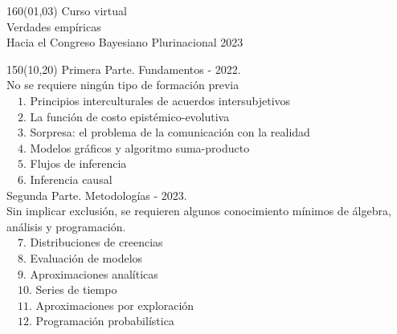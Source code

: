 \documentclass[shownotes,aspectratio=169]{beamer}
\begin{document}
\begin{frame}

\begin{textblock}{160}(01,03)\centering
\textcolor{black!85}{{\large
Curso virtual\\[-0.1cm] \Large Verdades empíricas \\[-0.1cm] \footnotesize Hacia el Congreso Bayesiano Plurinacional 2023}}
\end{textblock}


\begin{textblock}{150}(10,20)
\normalsize Primera Parte. Fundamentos - 2022. \\
\scriptsize No se requiere ningún tipo de formación previa \\[0.15cm] \footnotesize
\ \ $1$. Principios interculturales de acuerdos intersubjetivos \\
\ \ $2$. La función de costo epistémico-evolutiva\\
\ \ $3$. Sorpresa: el problema de la comunicación con la realidad \\
\ \ $4$. Modelos gráficos y algoritmo suma-producto\\
\ \ $5$. Flujos de inferencia \\
\ \ $6$. Inferencia causal \\[0.4cm]
\normalsize Segunda Parte. Metodologías - 2023.\scriptsize \\ Sin implicar exclusión, se requieren algunos conocimiento mínimos de álgebra, análisis y programación. \\[0.15cm] \footnotesize
\ \ $7$. Distribuciones de creencias \\
\ \ $8$. Evaluación de modelos \\
\ \ $9$. Aproximaciones analíticas \\
\ \ $10$. Series de tiempo\\
\ \ $11$. Aproximaciones por exploración \\
\ \ $12$. Programación probabilística\\
\end{textblock}



\end{frame}
\end{document}
